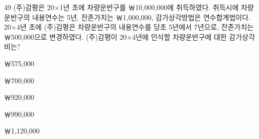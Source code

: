 \begin{question}{49}
(주)감평은 20×1년 초에 차량운반구를 ￦10,000,000에 취득하였다. 취득시에 차량운반구의 내용연수는 5년, 잔존가치는 ￦1,000,000, 감가상각방법은 연수합계법이다. 20×4년 초에 (주)감평은 차량운반구의 내용연수를 당초 5년에서 7년으로, 잔존가치는 ￦500,000으로 변경하였다. (주)감평이 20×4년에 인식할 차량운반구에 대한 감가상각비는?
\begin{choices}
  \item ￦575,000
  \item ￦700,000
  \item ￦920,000
  \item ￦990,000
  \item ￦1,120,000
\end{choices}
\end{question}

